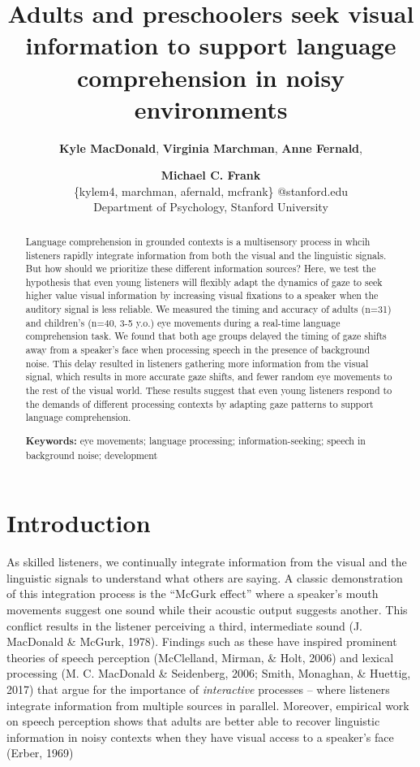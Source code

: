 \documentclass[10pt, letterpaper]{article}
\title{Adults and preschoolers seek visual information to support language
comprehension in noisy environments}
\author{{\large \bf Kyle MacDonald}, {\large \bf Virginia Marchman}, {\large \bf Anne Fernald}, \and {\large \bf Michael C. Frank} \\ \{kylem4, marchman, afernald, mcfrank\} @stanford.edu \\ Department of Psychology, Stanford University}
\begin{document}
\maketitle

\begin{abstract}
Language comprehension in grounded contexts is a multisensory process in
whcih listeners rapidly integrate information from both the visual and
the linguistic signals. But how should we prioritize these different
information sources? Here, we test the hypothesis that even young
listeners will flexibly adapt the dynamics of gaze to seek higher value
visual information by increasing visual fixations to a speaker when the
auditory signal is less reliable. We measured the timing and accuracy of
adults (n=31) and children's (n=40, 3-5 y.o.) eye movements during a
real-time language comprehension task. We found that both age groups
delayed the timing of gaze shifts away from a speaker's face when
processing speech in the presence of background noise. This delay
resulted in listeners gathering more information from the visual signal,
which results in more accurate gaze shifts, and fewer random eye
movements to the rest of the visual world. These results suggest that
even young listeners respond to the demands of different processing
contexts by adapting gaze patterns to support language comprehension.

\textbf{Keywords:}
eye movements; language processing; information-seeking; speech in
background noise; development
\end{abstract}

\section{Introduction}\label{introduction}

As skilled listeners, we continually integrate information from the
visual and the linguistic signals to understand what others are saying.
A classic demonstration of this integration process is the ``McGurk
effect'' where a speaker's mouth movements suggest one sound while their
acoustic output suggests another. This conflict results in the listener
perceiving a third, intermediate sound (J. MacDonald \& McGurk, 1978).
Findings such as these have inspired prominent theories of speech
perception (McClelland, Mirman, \& Holt, 2006) and lexical processing
(M. C. MacDonald \& Seidenberg, 2006; Smith, Monaghan, \& Huettig, 2017)
that argue for the importance of \emph{interactive} processes -- where
listeners integrate information from multiple sources in parallel.
Moreover, empirical work on speech perception shows that adults are
better able to recover linguistic information in noisy contexts when
they have visual access to a speaker's face (Erber, 1969)
\end{document}

